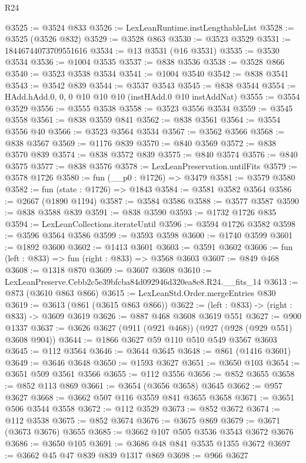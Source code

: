 \begin{lexlean}{R24}
\begin{coremodule}
@3525 := @3524 @833
@3526 := LexLeanRuntime.instLengthableList
@3528 := @3525 (@3526 @832)
@3529 := @3528 @863
@3530 := @3523 @3529
@3531 := 18446744073709551616
@3534 := @13 @3531 (@16 @3531)
@3535 := @3530 @3534
@3536 := @1004 @3535
@3537 := @838 @3536
@3538 := @3528 @866
@3540 := @3523 @3538 @3534
@3541 := @1004 @3540
@3542 := @838 @3541
@3543 := @3542 @839
@3544 := @3537 @3543
@3545 := @838 @3544
@3554 := HAdd.hAdd.{0, 0, 0} @10 @10 @10 (instHAdd.{0} @10 instAddNat)
@3555 := @3554 @3529
@3556 := @3555 @3538
@3558 := @3523 @3556 @3534
@3559 := @3545 @3558
@3561 := @838 @3559 @841
@3562 := @838 @3561
@3564 := @3554 @3556 @40
@3566 := @3523 @3564 @3534
@3567 := @3562 @3566
@3568 := @838 @3567
@3569 := @1176 @839
@3570 := @840 @3569
@3572 := @838 @3570 @839
@3574 := @838 @3572 @839
@3575 := @840 @3574
@3576 := @840 @3575
@3577 := @838 @3576
@3578 := LexLeanPreservation.untilFits
@3579 := @3578 @1726
@3580 := fun (__p0 : @1726) => @3479
@3581 := @3579 @3580
@3582 := fun (state : @1726) => @1843
@3584 := @3581 @3582 @3564
@3586 := @2667 (@1890 @1194)
@3587 := @3584 @3586
@3588 := @3577 @3587
@3590 := @838 @3588 @839
@3591 := @838 @3590
@3593 := @1732 @1726 @835
@3594 := LexLeanCollections.iterateUntil
@3596 := @3594 @1726 @3582
@3598 := @3596 @3564 @3586
@3599 := @3593 @3598
@3600 := @1740 @3599
@3601 := @1892 @3600
@3602 := @1413 @3601
@3603 := @3591 @3602
@3606 := fun (left : @833) => fun (right : @833) => @3568 @3603
@3607 := @849 @468
@3608 := @1318 @870
@3609 := @3607 @3608
@3610 := LexLeanPreserve.Cebb2c5e39bfcba84d092946d320ea8e8.R24.__fits_14
@3613 := @873 (@3610 @863 @866)
@3615 := LexLeanStd.Order.mergeEntries @830
@3619 := @3613 (@861 (@3615 @863 @866))
@3622 := (left : @833) -> (right : @833) -> @3609 @3619
@3626 := @887 @468 @3608 @3619 @551
@3627 := @900 @1337
@3637 := @3626 @3627 (@911 (@921 @468)) (@927 (@928 (@929 @551) @3608 @904))
@3644 := @1866 @3627 @59 @110 @510 @549 @3567 @3603
@3645 := @112 @3564
@3646 := @3644 @3645
@3648 := @861 (@1416 @3601)
@3649 := @3646 @3648
@3650 := @1593 @3627
@3651 := @3650 @103
@3654 := @3651 @509 @3561 @3566
@3655 := @112 @3556
@3656 := @852 @3655
@3658 := @852 @113 @869
@3661 := @3654 (@3656 @3658) @3645
@3662 := @957 @3627
@3668 := @3662 @507 @116 @3559 @841 @3655 @3658
@3671 := @3651 @506 @3544 @3558
@3672 := @112 @3529
@3673 := @852 @3672
@3674 := @112 @3538
@3675 := @852 @3674
@3676 := @3675 @869
@3679 := @3671 (@3673 @3676) @3655
@3685 := @3662 @107 @505 @3536 @3543 @3672 @3676
@3686 := @3650 @105
@3691 := @3686 @48 @841 @3535 @1355 @3672
@3697 := @3662 @45 @47 @839 @839 @1317 @869
@3698 := @966 @3627

\end{coremodule}
\end{lexlean}
